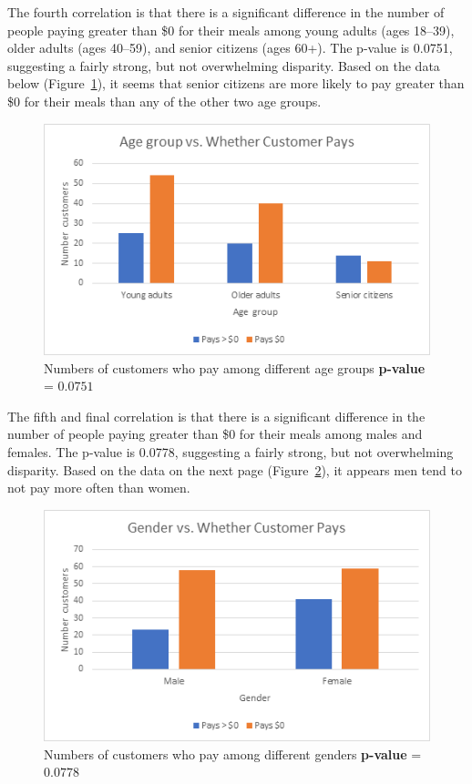 The fourth correlation is that there is a significant difference in the number of people paying greater than \$0 for their meals among young adults (ages 18--39), older adults (ages 40--59), and senior citizens (ages 60+). The p-value is 0.0751, suggesting a fairly strong, but not overwhelming disparity. Based on the data below (Figure~\ref{fig:age-v-pay}), it seems that senior citizens are more likely to pay greater than \$0 for their meals than any of the other two age groups.

\begin{figure}[H]
    \centering \includegraphics*[scale=.5]{assets/age-v-pay.png}
    
    \caption{Numbers of customers who pay among different age groups
    \textbf{p-value} = \(0.0751\)}\label{fig:age-v-pay}
\end{figure}

The fifth and final correlation is that there is a significant difference in the number of people paying greater than \$0 for their meals among males and females. The p-value is 0.0778, suggesting a fairly strong, but not overwhelming disparity. Based on the data on the next page (Figure~\ref{fig:gender-v-pay}), it appears men tend to not pay more often than women.

\begin{figure}[H]
    \centering \includegraphics*[scale=.5]{assets/gender-v-pay.png}
    
    \caption{Numbers of customers who pay among different genders
    \textbf{p-value} = \(0.0778\)}\label{fig:gender-v-pay}
\end{figure}

